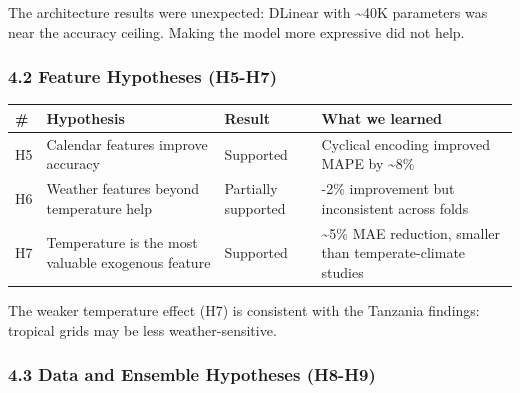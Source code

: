 The architecture results were unexpected: DLinear with
\textasciitilde40K parameters was near the accuracy ceiling. Making the
model more expressive did not help.

\subsubsection{4.2 Feature Hypotheses
(H5-H7)}\label{feature-hypotheses-h5-h7}

{\def\LTcaptype{none} %
\begin{longtable}[]{@{}
  >{\raggedright\arraybackslash}p{}
  >{\raggedright\arraybackslash}p{}
  >{\raggedright\arraybackslash}p{}
  >{\raggedright\arraybackslash}p{}@{}}
\toprule\noalign{}
\begin{minipage}[b]{\linewidth}\raggedright
\#
\end{minipage} & \begin{minipage}[b]{\linewidth}\raggedright
Hypothesis
\end{minipage} & \begin{minipage}[b]{\linewidth}\raggedright
Result
\end{minipage} & \begin{minipage}[b]{\linewidth}\raggedright
What we learned
\end{minipage} \\
\midrule\noalign{}
\endhead
\bottomrule\noalign{}
\endlastfoot
H5 & Calendar features improve accuracy & Supported & Cyclical encoding
improved MAPE by \textasciitilde8\% \\
H6 & Weather features beyond temperature help & Partially supported &
1-2\% improvement but inconsistent across folds \\
H7 & Temperature is the most valuable exogenous feature & Supported &
\textasciitilde5\% MAE reduction, smaller than temperate-climate
studies \\
\end{longtable}
}

The weaker temperature effect (H7) is consistent with the Tanzania
findings: tropical grids may be less weather-sensitive.

\subsubsection{4.3 Data and Ensemble Hypotheses
(H8-H9)}\label{data-and-ensemble-hypotheses-h8-h9}

